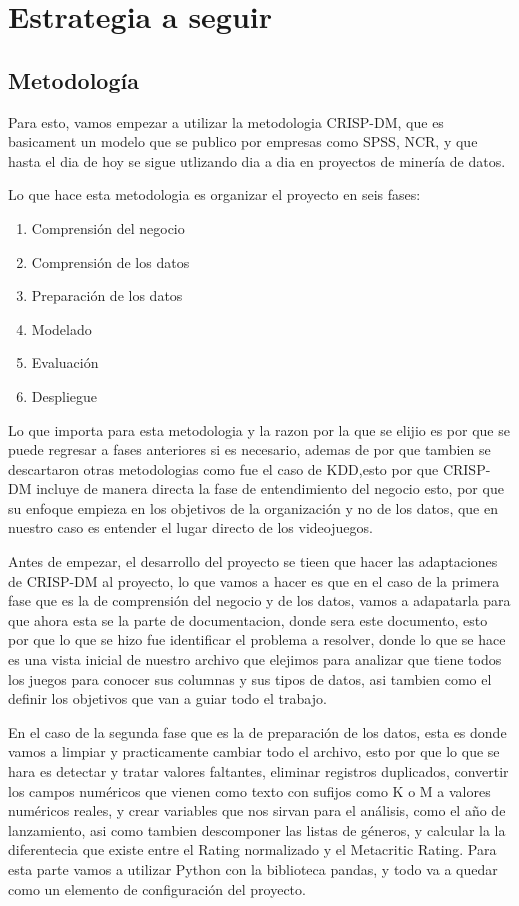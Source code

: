 \documentclass[letterpaper,11pt]{article}
\begin{document}
\section{Estrategia a seguir}

\subsection*{Metodología}

Para esto, vamos empezar a utilizar la metodologia
CRISP-DM, que es basicament un modelo que se 
publico por empresas como SPSS, NCR, 
y que hasta el dia de hoy se sigue utlizando dia a dia
en proyectos de minería de datos. 

Lo que hace esta metodologia es organizar el 
proyecto en seis fases: 

\begin{enumerate}
  \item Comprensión del negocio
  \item Comprensión de los datos
  \item Preparación de los datos
  \item Modelado
  \item Evaluación
  \item Despliegue
\end{enumerate}

Lo que importa para esta metodologia y la razon 
por la que se elijio es por que se puede regresar
a fases anteriores si es necesario, ademas de 
por que tambien se descartaron otras metodologias como fue el caso 
de KDD,esto por que CRISP-DM incluye de manera directa la fase 
de entendimiento del negocio esto, por que su enfoque empieza
en los objetivos de la organización y no de los datos, que en nuestro 
caso es entender el lugar directo de los videojuegos.


Antes de empezar, el desarrollo del proyecto 
se tieen que hacer las adaptaciones de CRISP-DM al 
proyecto, lo que vamos a hacer es que en el caso de 
la primera fase que es la de comprensión del negocio 
y de los datos, vamos a adapatarla 
para que ahora esta se la parte de documentacion, 
donde sera este documento, esto por que 
lo que se hizo fue identificar el problema a resolver, donde lo que 
se hace es una vista inicial de nuestro archivo que elejimos para 
analizar que tiene todos los juegos para conocer 
sus columnas y sus tipos de datos, asi tambien como el
definir los objetivos que van a guiar todo el trabajo.

En el caso de la segunda fase que es la de preparación 
de los datos, esta es donde vamos a limpiar y 
practicamente cambiar todo el archivo, esto por que 
lo que se hara es detectar y tratar valores faltantes, 
eliminar registros duplicados, 
convertir los campos numéricos que vienen como texto
con sufijos como K o M a valores numéricos reales, 
y crear variables que nos sirvan para el análisis, 
como el año de lanzamiento, asi como tambien descomponer 
las listas de géneros, y calcular la la diferentecia que existe 
entre el Rating normalizado y el Metacritic Rating. 
Para esta parte vamos a utilizar Python con la biblioteca pandas, 
y todo va a quedar como un elemento de configuración del proyecto.
\end{document}
